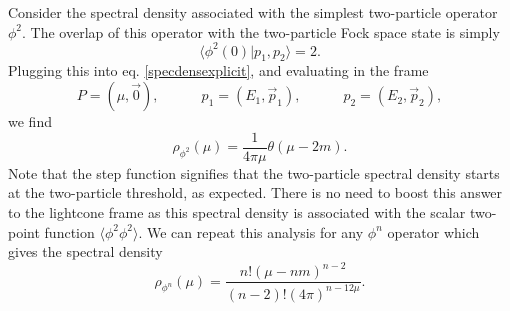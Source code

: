 Consider the spectral density associated with the simplest two-particle operator 
$\phi^2$. The overlap of this operator with the two-particle Fock space state is 
simply 
\begin{equation}
    \langle \phi^2(0) | p_1, p_2 \rangle = 2.
\end{equation} 
Plugging this into eq. \eqref{specdensexplicit}, and evaluating in the frame 
\begin{equation}
    P = (\mu, \vec{0}), \quad\quad\quad p_1 = (E_1, \vec{p}_1), \quad\quad\quad p_2 = (E_2, \vec{p}_2),
\end{equation} 
we find 
\begin{equation}
    \rho_{\phi^2}(\mu) = \frac{1}{4\pi \mu} \theta(\mu - 2m).
\end{equation} Note that the step function signifies that the two-particle 
spectral density starts at the two-particle threshold, as expected. There is no 
need to boost this answer to the lightcone frame as this spectral density is 
associated with the scalar two-point function $\langle \phi^2 \phi^2 \rangle$. 
We can repeat this analysis for any $\phi^n$ operator which gives the spectral 
density 
\begin{equation}
    \rho_{\phi^n}(\mu) = \frac{n!(\mu-n m)^{n-2}}{(n-2)!(4\pi)^{n-1 2\mu}}.
\end{equation}

